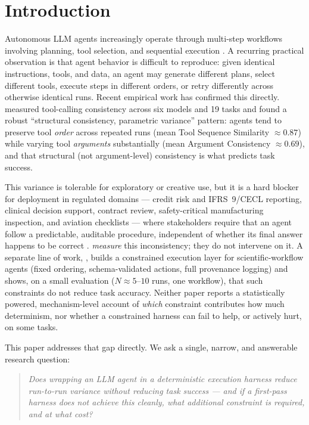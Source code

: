 \documentclass[11pt]{article}
\begin{document}
\section{Introduction}

Autonomous LLM agents increasingly operate through multi-step workflows involving planning, tool selection, and sequential execution \cite{langchain,langgraph}. A recurring practical observation is that agent behavior is difficult to reproduce: given identical instructions, tools, and data, an agent may generate different plans, select different tools, execute steps in different orders, or retry differently across otherwise identical runs. Recent empirical work has confirmed this directly. \cite{yagubyan2026} measured tool-calling consistency across six models and 19 tasks and found a robust ``structural consistency, parametric variance'' pattern: agents tend to preserve tool \emph{order} across repeated runs (mean Tool Sequence Similarity $\approx 0.87$) while varying tool \emph{arguments} substantially (mean Argument Consistency $\approx 0.69$), and that structural (not argument-level) consistency is what predicts task success.

This variance is tolerable for exploratory or creative use, but it is a hard blocker for deployment in regulated domains --- credit risk and IFRS~9/CECL reporting, clinical decision support, contract review, safety-critical manufacturing inspection, and aviation checklists --- where stakeholders require that an agent follow a predictable, auditable procedure, independent of whether its final answer happens to be correct \cite{finai2026}. \cite{yagubyan2026} \emph{measure} this inconsistency; they do not intervene on it. A separate line of work, \cite{rlam2026}, builds a constrained execution layer for scientific-workflow agents (fixed ordering, schema-validated actions, full provenance logging) and shows, on a small evaluation ($N \approx 5$--$10$ runs, one workflow), that such constraints do not reduce task accuracy. Neither paper reports a statistically powered, mechanism-level account of \emph{which} constraint contributes how much determinism, nor whether a constrained harness can fail to help, or actively hurt, on some tasks.

This paper addresses that gap directly. We ask a single, narrow, and answerable research question:

\begin{quote}
\emph{Does wrapping an LLM agent in a deterministic execution harness reduce run-to-run variance without reducing task success --- and if a first-pass harness does not achieve this cleanly, what additional constraint is required, and at what cost?}
\end{quote}
\end{document}
